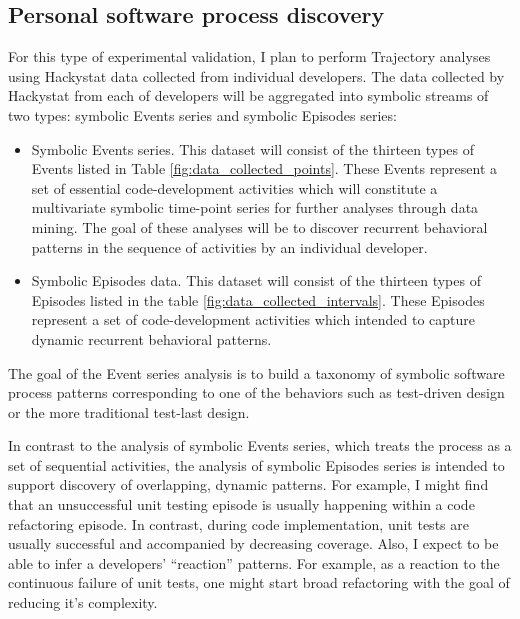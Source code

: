 \subsection{Personal software process discovery}
For this type of experimental validation, I plan to perform Trajectory analyses using Hackystat data collected from individual developers. The data collected by Hackystat from each of developers will be aggregated into symbolic streams of two types: symbolic Events series and symbolic Episodes series:
\begin{itemize}
	\item Symbolic Events series. This dataset will consist of the thirteen types of Events listed in Table \ref{fig:data_collected_points}. These Events represent a set of essential code-development activities which will constitute a multivariate symbolic time-point series for further analyses through data mining. The goal of these analyses will be to discover recurrent behavioral patterns in the sequence of activities by an individual developer. 
	\item Symbolic Episodes data. This dataset will consist of the thirteen types of Episodes listed in the table \ref{fig:data_collected_intervals}. These Episodes represent a set of code-development activities which intended to capture dynamic recurrent behavioral patterns.
\end{itemize}

The goal of the Event series analysis is to build a taxonomy of symbolic software process patterns corresponding to one of the behaviors such as test-driven design or the more traditional test-last design.

In contrast to the analysis of symbolic Events series, which treats the process as a set of sequential activities, the analysis of symbolic Episodes series is intended to support discovery of overlapping, dynamic patterns. For example, I might find that an unsuccessful unit testing episode is usually happening within a code refactoring episode. In contrast, during code implementation, unit tests are usually successful and accompanied by decreasing coverage. Also, I expect to be able to infer a developers' ``reaction'' patterns. For example, as a reaction to the continuous failure of unit tests, one might start broad refactoring with the goal of reducing it's complexity. 

